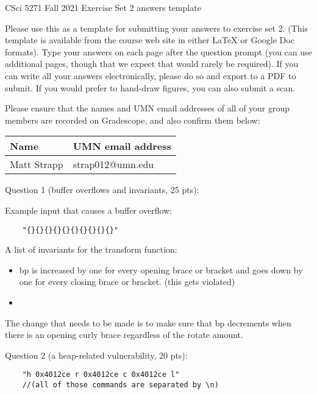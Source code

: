 \documentclass[11pt]{article}
\begin{document}
\begin{center}
CSci 5271 Fall 2021 Exercise Set 2 answers template
\end{center}

Please use this as a template for submitting your answers to
exercise set 2. (This template is available from the course web site
in either LaTeX or Google Doc formats). Type your answers on each page
after the question prompt (you can use additional pages, though that
we expect that would rarely be required). If you can write all your
answers electronically, please do so and export to a PDF to submit.
If you would prefer to hand-draw figures, you can also submit a scan.

Please ensure that the names and UMN email addresses of all of your
group members are recorded on Gradescope, and also confirm them below:

\vspace{10pt}

\begin{tabular}{|p{2.6in}|p{2.6in}|}\hline
Name & UMN email address\\\hline
Matt Strapp & strap012@umn.edu \\\hline
\end{tabular}

\vspace{10pt}

Question 1 (buffer overflows and invariants, 25 pts):

Example input that causes a buffer overflow:
\begin{verbatim}
    "{}{}{}{}{}{}{}{}{}{}"
\end{verbatim}

A list of invariants for the transform function:
\begin{itemize}
    \item bp is increased by one for every opening brace or bracket and goes down by one for every closing brace or bracket. (this gets violated)
    \item 
\end{itemize}
The change that needs to be made is to make sure that bp decrements when there is an opening curly brace regardless of the rotate amount.

\newpage

Question 2 (a heap-related vulnerability, 20 pts):
\begin{verbatim}
    "h 0x4012ce r 0x4012ce c 0x4012ce l" 
    //(all of those commands are separated by \n)
\end{verbatim}
\end{document}
